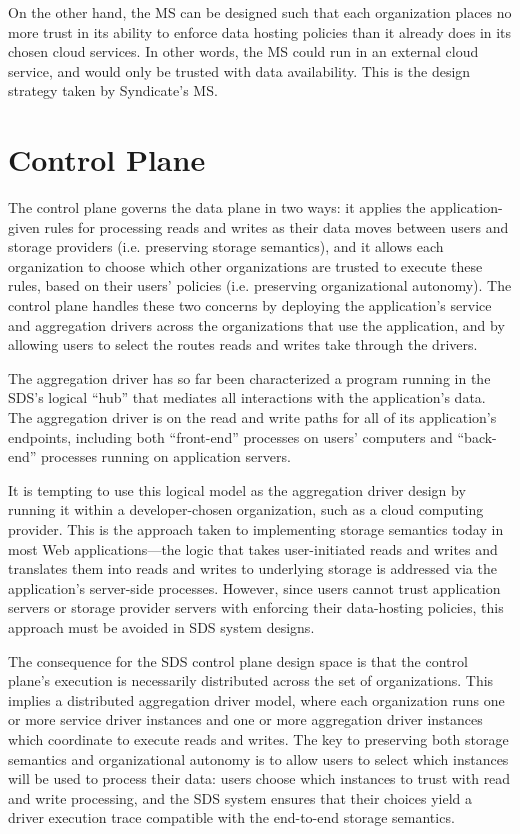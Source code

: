 On the other hand, the MS can be designed such that each organization
places no more trust in its ability to enforce data hosting policies
than it already does in its chosen cloud services.  In other words, the
MS could run in an external cloud service, and would only be trusted
with data availability.  This is the design strategy taken by Syndicate's MS.

\section{Control Plane}

The control plane governs the data plane in two ways:  it applies
the application-given rules for processing reads and writes as their data moves
between users and storage providers (i.e. preserving storage semantics),
and it allows each organization to choose which other organizations
are trusted to execute these rules, based on their users' policies
(i.e. preserving organizational autonomy).
The control plane handles these two concerns by deploying the application's
service and aggregation drivers across the organizations that use the
application, and by allowing users
to select the routes reads and writes take through the drivers.

The aggregation driver has so far been characterized a program running in the 
SDS's logical ``hub''
that mediates all interactions with the application's data.  The aggregation
driver is on the read and write paths for all of its application's endpoints, including
both ``front-end'' processes on users' computers and
``back-end'' processes running on application servers.

It is tempting to use this logical model as the aggregation driver design by
running it within a developer-chosen organization, such as a cloud computing
provider.  This is the approach taken to implementing storage semantics today
in most Web applications---the logic that takes user-initiated reads and writes and
translates them into reads and writes to underlying storage is addressed via
the application's server-side processes.  However, since users cannot trust 
application servers or storage provider servers with
enforcing their data-hosting policies, this approach must be avoided in SDS
system designs.

The consequence for the SDS control plane design space is that the control plane's
execution is necessarily distributed across the set of organizations.  This
implies a distributed aggregation driver model, where each organization runs
one or more service driver instances and one or more aggregation driver
instances which coordinate to execute reads and writes.
The key to preserving both storage semantics and organizational
autonomy is to allow users to select which instances will be used to process
their data:  users choose which instances to trust with read and write
processing, and the SDS system ensures that their choices yield a driver
execution trace compatible with the end-to-end storage semantics.

